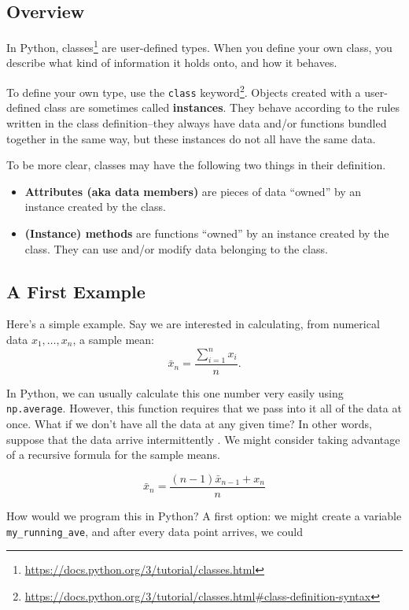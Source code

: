 \documentclass[
  12pt,
  krantz2]{krantz}
\renewcommand{\href}[2]{#2\footnote{\url{#1}}}
\begin{document}
\hypertarget{overview}{%
\subsection{Overview}\label{overview}}

In Python, \href{https://docs.python.org/3/tutorial/classes.html}{classes} are user-defined types. When you define your own class, you describe what kind of information it holds onto, and how it behaves.

To define your own type, use the \href{https://docs.python.org/3/tutorial/classes.html\#class-definition-syntax}{\texttt{class} keyword}. Objects created with a user-defined class are sometimes called \textbf{instances}. They behave according to the rules written in the class definition--they always have data and/or functions bundled together in the same way, but these instances do not all have the same data.

To be more clear, classes may have the following two things in their definition.

\begin{itemize}
\item
  \textbf{Attributes (aka data members)} are pieces of data ``owned'' by an instance created by the class.
\item
  \textbf{(Instance) methods} are functions ``owned'' by an instance created by the class. They can use and/or modify data belonging to the class.
\end{itemize}

\hypertarget{a-first-example}{%
\subsection{A First Example}\label{a-first-example}}

Here's a simple example. Say we are interested in calculating, from numerical data \(x_1, \ldots, x_n\), a sample mean:
\[
\bar{x}_n = \frac{\sum_{i=1}^n x_i}{n}.
\]

In Python, we can usually calculate this one number very easily using \texttt{np.average}. However, this function requires that we pass into it all of the data at once. What if we don't have all the data at any given time? In other words, suppose that the data arrive intermittently
.
We might consider taking advantage of a recursive formula for the sample means.

\[
\bar{x}_n =  \frac{(n-1) \bar{x}_{n-1} + x_n}{n}
\]

How would we program this in Python? A first option: we might create a variable \texttt{my\_running\_ave}, and after every data point arrives, we could
\end{document}

